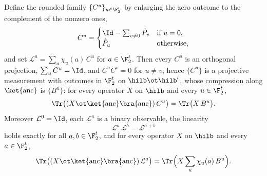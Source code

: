 \begin{lemma}
\[	\]
	Define the rounded family $\{C^u\}_{u \in \F_2^t}$ by enlarging the zero
	outcome to the complement of the nonzero ones,
	\[
		C^u =
		\begin{cases}
			\Id - \sum_{v \ne 0} \hat{P}_v & \text{if } u = 0, \\
			\hat{P}_u & \text{otherwise,}
		\end{cases}
	\]
	and set $\mathcal{L}^a = \sum_u \chi_u(a) \, C^u$ for $a \in \F_2^t$. Then
	every $C^u$ is an orthogonal projection, $\sum_u C^u = \Id$, and
	$C^u C^v = 0$ for $u \ne v$; hence $\{C^u\}$ is a projective measurement
	with outcomes in $\F_2^t$ on $\hilb \ot \hilb'$, whose compression along
	$\ket{\mathrm{anc}}$ is $\{B^u\}$: for every operator $X$ on $\hilb$ and
	every $u \in \F_2^t$,
	\[
		\Tr\big((X \ot \ket{\mathrm{anc}}\bra{\mathrm{anc}}) \, C^u\big)
		= \Tr\big(X \, B^u\big) .
	\]
	Moreover $\mathcal{L}^0 = \Id$, each $\mathcal{L}^a$ is a binary
	observable, the linearity
	\[
		\mathcal{L}^a \, \mathcal{L}^b = \mathcal{L}^{a+b}
	\]
	holds exactly for all $a, b \in \F_2^t$, and for every operator $X$ on
	$\hilb$ and every $a \in \F_2^t$,
	\[
		\Tr\big((X \ot \ket{\mathrm{anc}}\bra{\mathrm{anc}}) \,
		\mathcal{L}^a\big)
		= \Tr\Big(X \sum_u \chi_u(a) \, B^u\Big) .
	\]
\end{lemma}
